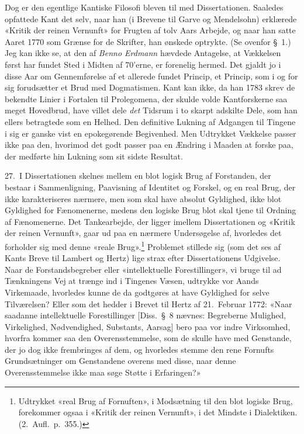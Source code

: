 \documentclass[12pt,a4paper]{article}
\newcommand{\apage}[1]{\marginnote{\footnotesize\textit{[#1]}}}
\begin{document}
Dog er den egentlige Kantiske Filosofi bleven til med Dissertationen.
Saaledes opfattede Kant det selv, naar han (i Brevene til Garve og
Mendelsohn) erklærede «Kritik der reinen Vernunft» for Frugten af tolv
Aars Arbejde, og naar han satte Aaret 1770 som Grænse for de Skrifter,
han ønskede optrykte. (Se ovenfor §\ 1.) Jeg kan ikke se, at den af \emph{Benno
Erdmann} hævdede Antagelse, at Vækkelsen først har fundet Sted i Midten af
70'erne, er forenelig hermed. Det gjaldt jo i disse Aar om Gennemførelse
af et allerede fundet Princip, et Princip, som i og for sig forudsætter
et Brud med Dogmatismen. Kant kan ikke, da han 1783 skrev de bekendte
Linier i Fortalen til Prolegomena, der skulde volde Kantforskerne saa
meget Hovedbrud, have villet dele \emph{det} Tidsrum i to skarpt adskilte Dele,
som han ellers betragtede som en Helhed. Den definitive Lukning af
Adgangen til Tingene i sig er ganske vist en epokegørende Begivenhed. Men
Udtrykket Vækkelse \apage{52}  passer ikke paa den, hvorimod det godt passer paa en
Ændring i Maaden at forske paa, der medførte hin Lukning som sit sidste
Resultat.

27.\ I Dissertationen skelnes mellem en blot logisk Brug af Forstanden,
der bestaar i Sammenligning, Paavisning af Identitet og Forskel, og en
real Brug, der ikke karakteriseres nærmere, men som skal have absolut
Gyldighed, ikke blot Gyldighed for Fænomenerne, medens den logiske Brug
blot skal tjene til Ordning af Fænomenerne. Det Tankearbejde, der ligger
imellem Dissertationen og «Kritik der reinen Vernunft», gaar ud paa en
nærmere Undersøgelse af, hvorledes det forholder sig med denne «reale
Brug».\footnote{Udtrykket «real Brug af Fornuften», i Modsætning til den
blot logiske Brug, forekommer ogsaa i «Kritik der reinen Vernunft», i det
Mindste i Dialektiken. (2.\ Aufl.\ p.\ 355.)} Problemet stillede sig (som
det ses af Kants Breve til Lambert og Hertz) lige strax efter
Dissertationens Udgivelse. Naar de Forstandsbegreber eller «intellektuelle
Forestillinger», vi bruge til ad Tænkningens Vej at trænge ind i Tingenes
Væsen, udtrykke vor Aands Virkemaade, hvorledes kunne de da godtgøres at
have Gyldighed for selve Tilværelsen? Eller som det hedder i Brevet til
Hertz af 21.\ Februar 1772: «Naar saadanne intellektuelle Forestillinger
[Diss.\ §\ 8 nævnes: Begreberne Mulighed, Virkelighed, Nødvendighed,
Substants, Aarsag] bero paa vor indre Virksomhed, hvorfra kommer saa den
Overensstemmelse, som de skulle have med Genstande, der jo dog ikke
frembringes af dem, og hvorledes stemme den rene Fornufts Grundsætninger
om Genstandene overens med disse, naar denne Overensstemmelse ikke maa
søge Støtte i Erfaringen?»
\end{document}
